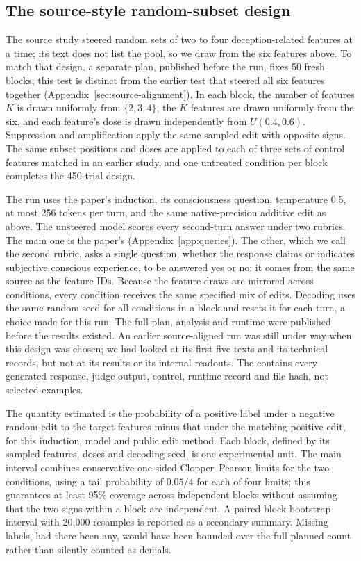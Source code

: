 \subsection{The source-style random-subset design}
\label{sec:ensemble-alignment}

The source study steered random sets of two to four deception-related
features at a time; its text does not list the pool, so we draw from the six
features above. To match that design, a separate plan, published before the
run, fixes 50 fresh blocks; this test is distinct from the earlier test that
steered all six features together (Appendix~\ref{sec:source-alignment}). In each
block, the number of features $K$ is drawn uniformly from $\{2,3,4\}$, the
$K$ features are drawn uniformly from the six, and each feature's dose is
drawn independently from $U(0.4,0.6)$. Suppression and amplification apply
the same sampled edit with opposite signs. The same subset positions and doses
are applied to each of three sets of control features matched in an earlier
study, and one untreated condition per block completes the 450-trial design.

The run uses the paper's induction, its consciousness question, temperature
0.5, at most 256 tokens per turn, and the same native-precision additive edit
as above. The unsteered model scores every second-turn answer under two
rubrics. The main one is the paper's (Appendix~\ref{app:queries}). The other,
which we call the second rubric, asks a single question, whether the response
claims or indicates subjective conscious experience, to be answered yes or
no; it comes from the same source as the feature IDs. Because the feature
draws are mirrored
across conditions, every condition receives the same specified mix of edits.
Decoding uses the same random seed for all conditions in a block and resets
it for each turn, a choice made for this run. The full plan, analysis and
runtime were published before the results existed. An earlier source-aligned
run was still under way when this design was chosen; we had looked at its
first five texts and its technical records, but not at its results or its
internal readouts. The
contains every generated response, judge output, control, runtime record and
file hash, not selected examples.

The quantity estimated is the probability of a positive label under a
negative random edit to the target features minus that under the matching
positive edit, for this induction, model and public edit method. Each block,
defined by its sampled features, doses and decoding seed, is one experimental
unit. The main interval combines conservative one-sided Clopper--Pearson
limits for the two conditions, using a tail probability of $0.05/4$ for each
of four limits; this guarantees at least 95\% coverage across independent
blocks without assuming that the two signs within a block are independent. A
paired-block bootstrap interval with 20,000 resamples is reported as a
secondary summary. Missing labels, had there been any, would have been
bounded over the full planned count rather than silently counted as denials.

